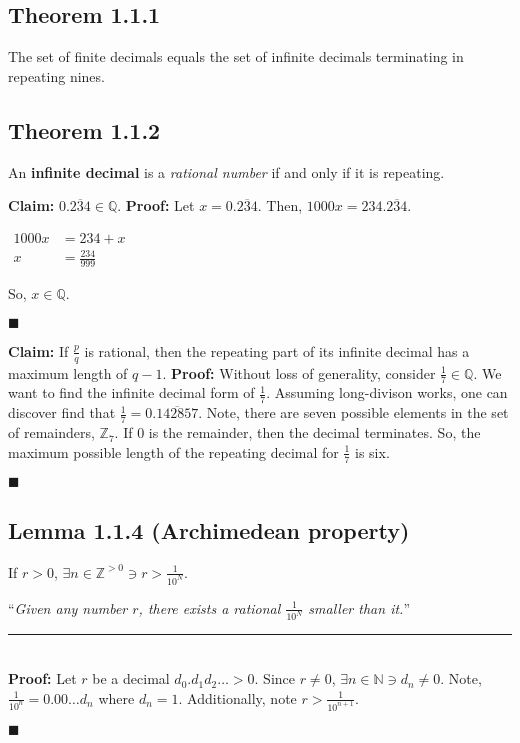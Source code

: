 \documentclass[11pt]{book}
\newcommand{\N}{\mathbb{N}}
\newcommand{\Q}{\mathbb{Q}}
\newcommand{\Z}{\mathbb{Z}}
\newcommand{\horline}{\noindent\rule{14.25cm}{0.6pt}\\}
\newcounter{lemma}
\newcommand{\QED}{\begin{flushright}$\blacksquare$\end{flushright}}
\begin{document}
	\subsection{Theorem 1.1.1}
		\begin{theor} 
			The set of finite decimals equals the set of infinite decimals terminating in repeating nines.
		\end{theor}
	\subsection{Theorem 1.1.2}
		\begin{theor}
			An \textbf{infinite decimal} is a \emph{rational number} if and only if it is repeating.
		\end{theor}

		\begin{examp}
			\textbf{Claim:} 0.$\overline{234} \in \Q$.\hfill\break
			\textbf{Proof:} Let $x = 0.\overline{234}$. Then, $1000x = 234.\overline{234}$.
			\begin{center}
				\begin{math}
					\begin{aligned}
				1000x & = 234 + x\\
				x & = \frac{234}{999}
					\end{aligned}	
				\end{math}
			\end{center}
			So, $x \in \Q$. \QED
		\end{examp}

		\begin{examp}
			\textbf{Claim:} If $\frac{p}{q}$ is rational, then the repeating part of its
			infinite decimal has a maximum length of $q-1$.\hfill\break
			\textbf{Proof:} Without loss of generality, consider $\frac{1}{7} \in \Q$. We want
			to find the infinite decimal form of $\frac{1}{7}$. Assuming long-divison works,
			one can discover find that $\frac{1}{7} = 0.\overline{142857}$.\hfill\break
			Note, there are seven possible elements in the set of remainders, $\Z_7$. 
			If 0 is the remainder, then the decimal terminates. So, the maximum possible length
			of the repeating decimal for $\frac{1}{7}$ is six. \QED
		\end{examp}

	\subsection{Lemma 1.1.4 (Archimedean property)}
	\label{subsec:lemma114}
		\begin{lemm}
			If $r > 0$, $\exists n \in \mathbb{Z}^{>0} \ni r > \frac{1}{10^N}$.

			``\emph{Given any number $r$, there exists a rational $\frac{1}{10^N}$ smaller than it.}''\hfill\break
			\horline
			\textbf{Proof:} Let $r$ be a decimal $d_0.d_1d_2\dots > 0$. Since $r \neq 0$,\hfill\break
			$\exists n \in \N \ni d_n \neq 0$. Note, $\frac{1}{10^n} = 0.00\dots d_n$ where\hfill\break
			$d_n = 1$. Additionally, note $r > \frac{1}{10^{n+1}}$. \QED

		\end{lemm}
\end{document}
